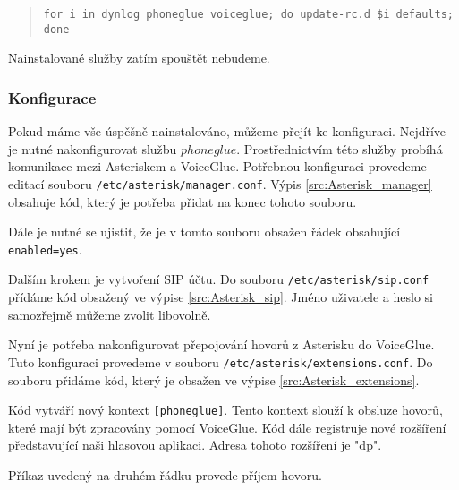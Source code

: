 \documentclass[ing,male,java,dept460,twoside]{diploma}						%
\begin{document}
\begin{quote}
\begin{sloppypar}
	\texttt{for i in dynlog phoneglue voiceglue; do update-rc.d \$i defaults; done}
\end{sloppypar}
\end{quote}

Nainstalované služby zatím spouštět nebudeme.

\subsubsection{Konfigurace}
Pokud máme vše úspěšně nainstalováno, můžeme přejít ke konfiguraci. Nejdříve je nutné nakonfigurovat službu $phoneglue$. Prostřednictvím této služby probíhá komunikace mezi Asteriskem a VoiceGlue. Potřebnou konfiguraci provedeme editací souboru \texttt{/etc/asterisk/manager.conf}. Výpis \ref{src:Asterisk_manager} obsahuje kód, který je potřeba přidat na konec tohoto souboru.



Dále je nutné se ujistit, že je v tomto souboru obsažen řádek obsahující \texttt{enabled=yes}.

Dalším krokem je vytvoření SIP účtu. Do souboru \texttt{/etc/asterisk/sip.conf} přídáme kód obsažený ve výpise \ref{src:Asterisk_sip}. Jméno uživatele a heslo si samozřejmě můžeme zvolit libovolně.



Nyní je potřeba nakonfigurovat přepojování hovorů z Asterisku do VoiceGlue. Tuto konfiguraci provedeme v souboru \texttt{/etc/asterisk/extensions.conf}. Do souboru přidáme kód, který je obsažen ve výpise \ref{src:Asterisk_extensions}.



Kód vytváří nový kontext \texttt{[phoneglue]}. Tento kontext slouží k obsluze hovorů, které mají být zpracovány pomocí VoiceGlue. Kód dále registruje nové rozšíření představující naši hlasovou aplikaci. Adresa tohoto rozšíření je "dp".

Příkaz uvedený na druhém řádku provede příjem hovoru.
\end{document}
